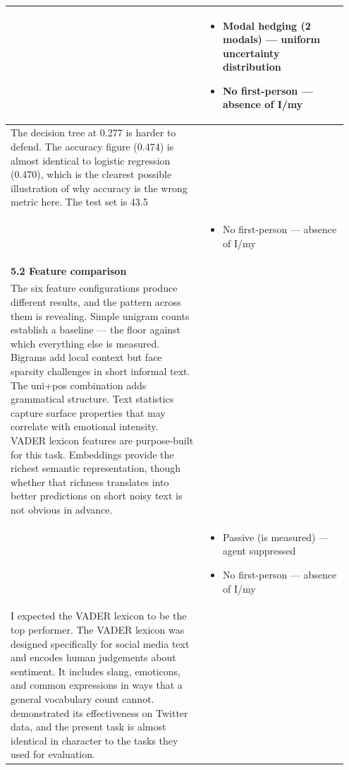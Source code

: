 \documentclass[11pt]{article}
\begin{document}
\begin{longtable}{|p{0.55\linewidth}|p{0.40\linewidth}|}
\hline
\rule[-3.5cm]{0pt}{3.5cm} & \begin{itemize}[leftmargin=1em,itemsep=1pt,topsep=1pt,parsep=0pt]
  \item Modal hedging (2 modals) --- uniform uncertainty distribution
  \item No first-person --- absence of I/my
\end{itemize} \\
\hline
The decision tree at 0.277 is harder to defend. The accuracy figure (0.474) is almost identical to logistic regression (0.470), which is the clearest possible illustration of why accuracy is the wrong metric here. The test set is 43.5 & \\[2pt]
\hline
\rule[-3.5cm]{0pt}{3.5cm} & \begin{itemize}[leftmargin=1em,itemsep=1pt,topsep=1pt,parsep=0pt]
  \item No first-person --- absence of I/my
\end{itemize} \\
\hline
\textbf{5.2 Feature comparison}\\[4pt]
The six feature configurations produce different results, and the pattern across them is revealing. Simple unigram counts establish a baseline --- the floor against which everything else is measured. Bigrams add local context but face sparsity challenges in short informal text. The uni+pos combination adds grammatical structure. Text statistics capture surface properties that may correlate with emotional intensity. VADER lexicon features are purpose-built for this task. Embeddings provide the richest semantic representation, though whether that richness translates into better predictions on short noisy text is not obvious in advance. & \\[2pt]
\hline
\rule[-3.5cm]{0pt}{3.5cm} & \begin{itemize}[leftmargin=1em,itemsep=1pt,topsep=1pt,parsep=0pt]
  \item Passive (is measured) --- agent suppressed
  \item No first-person --- absence of I/my
\end{itemize} \\
\hline
I expected the VADER lexicon to be the top performer. The VADER lexicon was designed specifically for social media text and encodes human judgements about sentiment. It includes slang, emoticons, and common expressions in ways that a general vocabulary count cannot. demonstrated its effectiveness on Twitter data, and the present task is almost identical in character to the tasks they used for evaluation. & \\[2pt]

\end{longtable}
\end{document}

